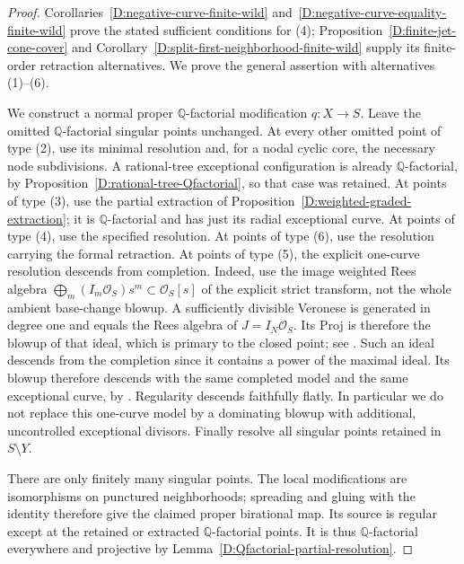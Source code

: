 \begin{proof}
Corollaries~\ref{D:negative-curve-finite-wild}
and~\ref{D:negative-curve-equality-finite-wild} prove the stated
sufficient conditions for (4); Proposition~\ref{D:finite-jet-cone-cover}
and Corollary~\ref{D:split-first-neighborhood-finite-wild} supply
its finite-order retraction alternatives.  We prove the general assertion
with alternatives (1)--(6).

We construct a normal proper $\mathbb Q$-factorial modification
$q:X\to S$.  Leave the omitted $\mathbb Q$-factorial singular
points unchanged.  At every other omitted point of type (2),
use its minimal resolution and, for a nodal cyclic core, the
necessary node subdivisions.  A rational-tree exceptional
configuration is already $\mathbb Q$-factorial, by
Proposition~\ref{D:rational-tree-Qfactorial}, so that case was
retained.  At points of type (3), use the partial extraction
of Proposition~\ref{D:weighted-graded-extraction}; it is
$\mathbb Q$-factorial and has just its radial exceptional curve.
At points of type (4), use the specified resolution.  At points of type (6), use the resolution carrying the formal
retraction.  At points
of type (5), the explicit one-curve resolution descends from
completion.  Indeed, use the image weighted Rees algebra
$\bigoplus_m (I_m\mathcal O_S)s^m\subset\mathcal O_S[s]$
of the explicit strict transform, not the whole ambient
base-change blowup.  A sufficiently divisible Veronese is
generated in degree one and equals the Rees algebra of
$J=I_N\mathcal O_S$.  Its Proj is therefore the blowup of
that ideal, which is primary to the closed point; see \cite[Lemma 10.56.2, tag 0EGH]{C_StacksWeightedCone}.
Such an ideal descends from the completion since it contains
a power of the maximal ideal.  Its blowup therefore descends
with the same completed model and the same exceptional curve,
by \cite[Lemmas 54.11.1--3, section 0BG4]{StacksBFiniteCone}.
Regularity descends faithfully flatly.  In particular we do
not replace this one-curve model by a dominating blowup with
additional, uncontrolled exceptional divisors.
Finally resolve all singular points retained in $S\setminus Y$.

There are only finitely many singular points.  The local
modifications are isomorphisms on punctured neighborhoods;
spreading and gluing with the identity therefore give the
claimed proper birational map.  Its source is regular except
at the retained or extracted $\mathbb Q$-factorial points.
It is thus $\mathbb Q$-factorial everywhere and projective by
Lemma~\ref{D:Qfactorial-partial-resolution}.


\end{proof}
